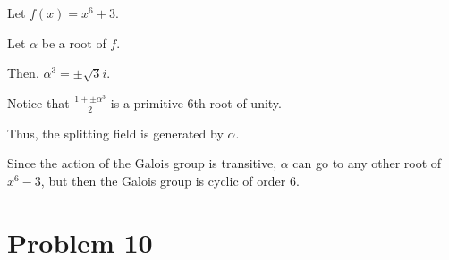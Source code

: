 \documentclass{article}
\theoremstyle{definition}
\begin{document}
Let $ f(x) = x^{6} + 3 $.

Let $ \alpha $ be a root of $ f $.

Then, $ \alpha^{3} = \pm \sqrt{3}i $.

Notice that $ \frac{1 + \pm \alpha^{3}}{2} $ is a primitive 6th root of unity.

Thus, the splitting field is generated by $ \alpha $.

Since the action of the Galois group is transitive, $ \alpha $ can go to any other root of $ x^{6} - 3 $,
but then the Galois group is cyclic of order $ 6 $.

\section{Problem 10}
\end{document}
